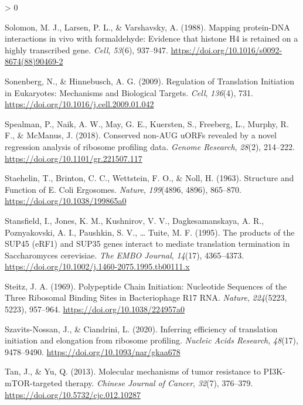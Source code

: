 \documentclass[
  12pt,
  openany]{book}
\newlength{\cslhangindent}
\newenvironment{CSLReferences}[2] %
 {%
  \setlength{\parindent}{0pt}
  \ifodd #1 \everypar{\setlength{\hangindent}{\cslhangindent}}\ignorespaces\fi
  \ifnum #2 > 0
  \setlength{\parskip}{#2\baselineskip}
  \fi
 }%
 {}
\begin{document}
\begin{CSLReferences}{1}{0}
\leavevmode\hypertarget{ref-Solomon1988}{}%
Solomon, M. J., Larsen, P. L., \& Varshavsky, A. (1988). Mapping protein-{DNA} interactions in vivo with formaldehyde: Evidence that histone {H4} is retained on a highly transcribed gene. \emph{Cell}, \emph{53}(6), 937--947. \url{https://doi.org/10.1016/s0092-8674(88)90469-2}

\leavevmode\hypertarget{ref-Sonenberg2009}{}%
Sonenberg, N., \& Hinnebusch, A. G. (2009). Regulation of {Translation Initiation} in {Eukaryotes}: {Mechanisms} and {Biological Targets}. \emph{Cell}, \emph{136}(4), 731. \url{https://doi.org/10.1016/j.cell.2009.01.042}

\leavevmode\hypertarget{ref-Spealman2018}{}%
Spealman, P., Naik, A. W., May, G. E., Kuersten, S., Freeberg, L., Murphy, R. F., \& McManus, J. (2018). Conserved non-{AUG uORFs} revealed by a novel regression analysis of ribosome profiling data. \emph{Genome Research}, \emph{28}(2), 214--222. \url{https://doi.org/10.1101/gr.221507.117}

\leavevmode\hypertarget{ref-Staehelin1963}{}%
Staehelin, T., Brinton, C. C., Wettstein, F. O., \& Noll, H. (1963). Structure and {Function} of {E}. {Coli Ergosomes}. \emph{Nature}, \emph{199}(4896, 4896), 865--870. \url{https://doi.org/10.1038/199865a0}

\leavevmode\hypertarget{ref-Stansfield1995}{}%
Stansfield, I., Jones, K. M., Kushnirov, V. V., Dagkesamanskaya, A. R., Poznyakovski, A. I., Paushkin, S. V., \ldots{} Tuite, M. F. (1995). The products of the {SUP45} ({eRF1}) and {SUP35} genes interact to mediate translation termination in {Saccharomyces} cerevisiae. \emph{The EMBO Journal}, \emph{14}(17), 4365--4373. \url{https://doi.org/10.1002/j.1460-2075.1995.tb00111.x}

\leavevmode\hypertarget{ref-Steitz1969}{}%
Steitz, J. A. (1969). Polypeptide {Chain Initiation}: {Nucleotide Sequences} of the {Three Ribosomal Binding Sites} in {Bacteriophage R17 RNA}. \emph{Nature}, \emph{224}(5223, 5223), 957--964. \url{https://doi.org/10.1038/224957a0}

\leavevmode\hypertarget{ref-Szavits-Nossan2020a}{}%
Szavits-Nossan, J., \& Ciandrini, L. (2020). Inferring efficiency of translation initiation and elongation from ribosome profiling. \emph{Nucleic Acids Research}, \emph{48}(17), 9478--9490. \url{https://doi.org/10.1093/nar/gkaa678}

\leavevmode\hypertarget{ref-Tan2013}{}%
Tan, J., \& Yu, Q. (2013). Molecular mechanisms of tumor resistance to {PI3K}-{mTOR}-targeted therapy. \emph{Chinese Journal of Cancer}, \emph{32}(7), 376--379. \url{https://doi.org/10.5732/cjc.012.10287}


\end{CSLReferences}
\end{document}
